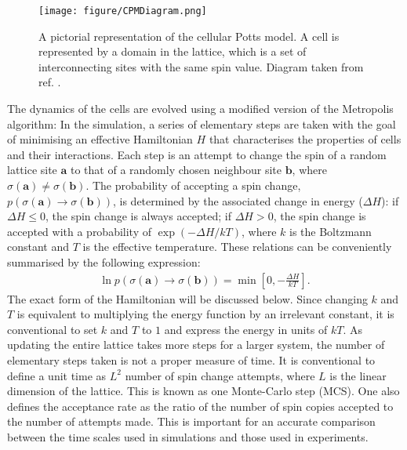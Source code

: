 \documentclass[a4paper,12pt]{article}
\newcommand{\inc}{\Delta}
\begin{document}
\begin{figure}[h]
\centering
\texttt{[image: figure/CPMDiagram.png]}
\caption{A pictorial representation of the cellular Potts model. A cell is represented by a domain in the lattice, which is a set of interconnecting sites with the same spin value. Diagram taken from ref. \cite{singlecell}.}
\label{fig:CPM}
\end{figure}

The dynamics of the cells are evolved using a modified version of the Metropolis algorithm: In the simulation, a series of elementary steps are taken with the goal of minimising an effective Hamiltonian $H$ that characterises the properties of cells and their interactions. Each step is an attempt to change the spin of a random lattice site $\bm{a}$ to that of a randomly chosen neighbour site $\bm{b}$, where $\sigma(\bm{a}) \neq \sigma(\bm{b})$. The probability of accepting a spin change, $p\left(\sigma(\bm{a}) \rightarrow \sigma(\bm{b})\right)$, is determined by the associated change in energy ($\inc H$): if $\inc H \leq 0$, the spin change is always accepted; if $\inc H > 0$, the spin change is accepted with a probability of $\exp(-\inc H / kT)$, where $k$ is the Boltzmann constant and $T$ is the effective temperature. These relations can be conveniently summarised by the following expression:
\begin{eqnarray}
\ln p\left(\sigma(\bm{a}) \rightarrow \sigma(\bm{b})\right) = \min\left[0,-\frac{\inc H}{kT}\right].
\end{eqnarray}
The exact form of the Hamiltonian will be discussed below. Since changing $k$ and $T$ is equivalent to multiplying the energy function by an irrelevant constant, it is conventional to set $k$ and $T$ to $1$ and express the energy in units of $kT$. As updating the entire lattice takes more steps for a larger system, the number of elementary steps taken is not a proper measure of time. It is conventional to define a unit time as $L^2$ number of spin change attempts, where $L$ is the linear dimension of the lattice. This is known as one Monte-Carlo step (MCS). One also defines the acceptance rate as the ratio of the number of spin copies accepted to the number of attempts made. This is important for an accurate comparison between the time scales used in simulations and those used in experiments\cite{sanz2010}.
\end{document}
